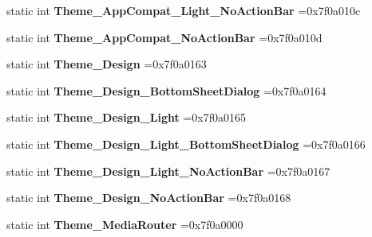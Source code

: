 \begin{DoxyCompactItemize}
static int {\bfseries Theme\+\_\+\+App\+Compat\+\_\+\+Light\+\_\+\+No\+Action\+Bar} =0x7f0a010c
\item 
\mbox{\label{classandroid_1_1support_1_1design_1_1R_1_1style_aaa44d3c51c7ee5f98c022c14b0f52ad9}} 
static int {\bfseries Theme\+\_\+\+App\+Compat\+\_\+\+No\+Action\+Bar} =0x7f0a010d
\item 
\mbox{\label{classandroid_1_1support_1_1design_1_1R_1_1style_a680ec1948afba59fb643d1200e38d086}} 
static int {\bfseries Theme\+\_\+\+Design} =0x7f0a0163
\item 
\mbox{\label{classandroid_1_1support_1_1design_1_1R_1_1style_a41b51d0f1f51a0c6121a1e4d74dfb29d}} 
static int {\bfseries Theme\+\_\+\+Design\+\_\+\+Bottom\+Sheet\+Dialog} =0x7f0a0164
\item 
\mbox{\label{classandroid_1_1support_1_1design_1_1R_1_1style_a9f3676d51d9228f47521abc7f55b3185}} 
static int {\bfseries Theme\+\_\+\+Design\+\_\+\+Light} =0x7f0a0165
\item 
\mbox{\label{classandroid_1_1support_1_1design_1_1R_1_1style_a8977fea51a93a40ef2926e1608f728db}} 
static int {\bfseries Theme\+\_\+\+Design\+\_\+\+Light\+\_\+\+Bottom\+Sheet\+Dialog} =0x7f0a0166
\item 
\mbox{\label{classandroid_1_1support_1_1design_1_1R_1_1style_a3794cdd36407fba6a308304e205f2577}} 
static int {\bfseries Theme\+\_\+\+Design\+\_\+\+Light\+\_\+\+No\+Action\+Bar} =0x7f0a0167
\item 
\mbox{\label{classandroid_1_1support_1_1design_1_1R_1_1style_a05dbb739993719483b4ca0db468304f2}} 
static int {\bfseries Theme\+\_\+\+Design\+\_\+\+No\+Action\+Bar} =0x7f0a0168
\item 
\mbox{\label{classandroid_1_1support_1_1design_1_1R_1_1style_a27f2ba6717fc3ff8d2c274e78d04bfc8}} 
static int {\bfseries Theme\+\_\+\+Media\+Router} =0x7f0a0000

\end{DoxyCompactItemize}

